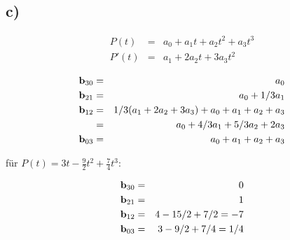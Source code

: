 \subsection*{c)}

\begin{eqnarray}
    P(t)&=& a_0 + a_1 t + a_2 t^2 + a_3 t^3\\
    P'(t)&=& a_1 + 2 a_2 t  + 3 a_3 t^2
\end{eqnarray}

\begin{eqnarray}
    {\bf b}_{30}&=&a_0\\
    {\bf b}_{21}&=&a_0+ 1/3 a_1\\ \nonumber
    {\bf b}_{12}&=&1/3 (a_1 + 2 a_2 + 3 a_3 ) + a_0 + a_1 + a_2 + a_3 \\
    &=& a_0 + 4/3 a_1 + 5/3 a_2 + 2 a_3 \\
    {\bf b}_{03}&=&a_0 + a_1 + a_2 + a_3
\end{eqnarray}

f\"ur $P(t) = 3t - \frac{9}{2} t^2 + \frac{7}{4} t^3$:

\begin{eqnarray}
    {\bf b}_{30}&=&0\\
    {\bf b}_{21}&=&1 \\
    {\bf b}_{12}&=& 4 - 15/2 + 7/2 = -7 \\
    {\bf b}_{03}&=& 3 - 9/2 + 7/4 = 1/4
\end{eqnarray}






